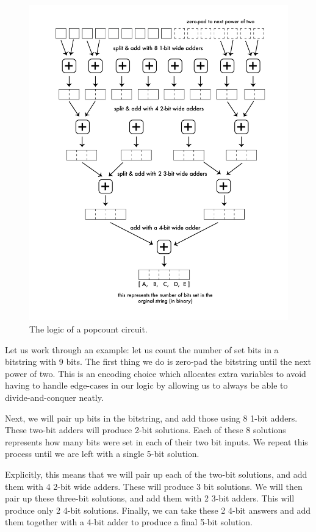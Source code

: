 \begin{figure}[t]
    \centerline{\includegraphics[origin=c,width=15cm]{fig_popcount}}
    \caption{The logic of a popcount circuit.}%
    \label{fig:popcount}%
\end{figure}

Let us work through an example: let us count the number of set bits in a bitstring with 9 bits. The first thing we do is zero-pad the bitstring until the next power of two. This is an encoding choice which allocates extra variables to avoid having to handle edge-cases in our logic by allowing us to always be able to divide-and-conquer neatly.

Next, we will pair up bits in the bitstring, and add those using 8 1-bit adders. These two-bit adders will produce 2-bit solutions. Each of these 8 solutions represents how many bits were set in each of their two bit inputs. We repeat this process until we are left with a single 5-bit solution.

Explicitly, this means that we will pair up each of the two-bit solutions, and add them with 4 2-bit wide adders. These will produce 3 bit solutions. We will then pair up these three-bit solutions, and add them with 2 3-bit adders. This will produce only 2 4-bit solutions. Finally, we can take these 2 4-bit answers and add them together with a 4-bit adder to produce a final 5-bit solution.


